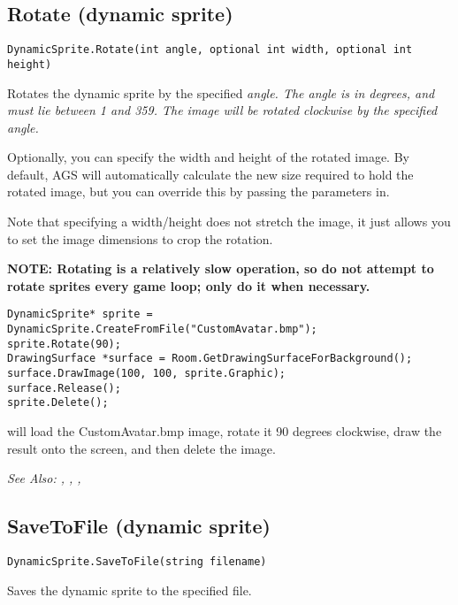 \subsection{Rotate (dynamic sprite)}\label{DynamicSprite.Rotate}%

\begin{verbatim}
DynamicSprite.Rotate(int angle, optional int width, optional int height)
\end{verbatim}
Rotates the dynamic sprite by the specified \it{angle}. The angle is in degrees,
and must lie between 1 and 359. The image will be rotated clockwise by the specified angle.

Optionally, you can specify the width and height of the rotated image. By default, AGS
will automatically calculate the new size required to hold the rotated image, but
you can override this by passing the parameters in.

Note that specifying a width/height does not stretch the image, it just allows you
to set the image dimensions to crop the rotation.

\bf{NOTE:} Rotating is a relatively slow operation, so do not attempt to rotate sprites
every game loop; only do it when necessary.

\begin{verbatim}
DynamicSprite* sprite = DynamicSprite.CreateFromFile("CustomAvatar.bmp");
sprite.Rotate(90);
DrawingSurface *surface = Room.GetDrawingSurfaceForBackground();
surface.DrawImage(100, 100, sprite.Graphic);
surface.Release();
sprite.Delete();
\end{verbatim}
will load the CustomAvatar.bmp image, rotate it 90 degrees clockwise, draw the result
onto the screen, and then delete the image.

\it{See Also:} ,
,
,


\subsection{SaveToFile (dynamic sprite)}\label{DynamicSprite.SaveToFile}%

\begin{verbatim}
DynamicSprite.SaveToFile(string filename)
\end{verbatim}
Saves the dynamic sprite to the specified file.

